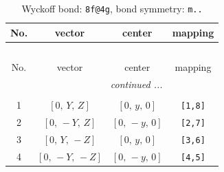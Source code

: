 \documentclass[fleqn,8pt]{jsarticle}
\begin{document}
\renewcommand{\arraystretch}{1.2}
\begin{longtable}{cccc}
\caption{Wyckoff bond: {\tt 8f@4g}, bond symmetry: {\tt m..}}
 \\
 \hline \hline
No. & vector & center & mapping \\ \hline \endfirsthead

\multicolumn{3}{l}{\tablename\ \thetable{}} \\
 \hline \hline
No. & vector & center & mapping \\ \hline \endhead

 \hline \hline
\multicolumn{3}{r}{\footnotesize\it continued ...} \\ \endfoot

 \hline \hline
\multicolumn{3}{r}{} \\ \endlastfoot

1 & $\left[ 0,\, Y,\, Z \right]$ & $\left[ 0,\, y,\, 0 \right]$ & {\tt [1,8]} \\ \hline
2 & $\left[ 0,\, - Y,\, Z \right]$ & $\left[ 0,\, - y,\, 0 \right]$ & {\tt [2,7]} \\ \hline
3 & $\left[ 0,\, Y,\, - Z \right]$ & $\left[ 0,\, y,\, 0 \right]$ & {\tt [3,6]} \\ \hline
4 & $\left[ 0,\, - Y,\, - Z \right]$ & $\left[ 0,\, - y,\, 0 \right]$ & {\tt [4,5]} \\
\end{longtable}
\renewcommand{\arraystretch}{1.2}
\end{document}
